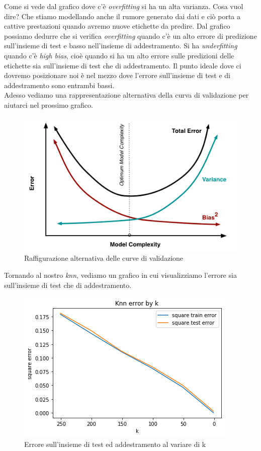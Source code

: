 Come si vede dal grafico dove c'\`e \textit{overfitting} si ha un alta varianza. Cosa vuol dire? Che stiamo modellando anche il rumore generato dai dati e ci\`o porta a cattive prestazioni quando avremo nuove etichette da predire. Dal grafico possiamo dedurre che si verifica \textit{overfitting} quando c'\`e un alto errore di predizione sull'insieme di test e basso nell'insieme di addestramento. Si ha \textit{underfitting} quando c'\`e \textit{high bias}, cio\`e quando si ha un alto errore sulle predizioni delle etichette sia sull'insieme di test che di addestramento. Il punto ideale dove ci dovremo posizionare noi \`e nel mezzo dove l'errore sull'insieme di test e di addestramento sono entrambi bassi.\\
Adesso vediamo una rappresentazione alternativa della curva di validazione per aiutarci nel prossimo grafico. 
\begin{figure}[H]
	\centering
	\includegraphics[width=0.7\linewidth]{img/biasvariance}
	\caption{Raffigurazione alternativa delle curve di validazione}
	\label{fig:biasvariance}
\end{figure}
Tornando al nostro \textit{knn}, vediamo un grafico in cui visualizziamo l'errore sia sull'insieme di test che di addestramento.
\begin{figure}[H]
	\centering
	\includegraphics[width=0.7\linewidth]{img/biasvariance_knn}
	\caption{Errore sull'insieme di test ed addestramento al variare di k}
	\label{fig:biasvarianceknn}
\end{figure}
